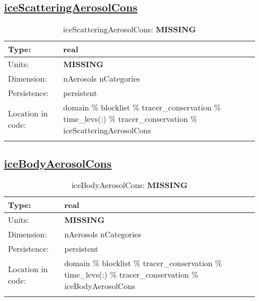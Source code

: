 \subsection[iceScatteringAerosolCons]{\hyperref[sec:var_tab_tracer_conservation]{iceScatteringAerosolCons}}
\label{subsec:var_sec_tracer_conservation_iceScatteringAerosolCons}
\begin{center}
\begin{longtable}{| p{2.0in} | p{4.0in} |}
        \hline 
        Type: & real \\
        \hline 
        Units: & {\bf \color{red} MISSING} \\
        \hline 
        Dimension: & nAerosols nCategories \\
        \hline 
        Persistence: & persistent \\
        \hline 
         Location in code: & domain \% blocklist \% tracer\_conservation \% time\_levs(:) \% tracer\_conservation \% iceScatteringAerosolCons \\
         \hline 
    \caption{iceScatteringAerosolCons: {\bf \color{red} MISSING}}
\end{longtable}
\end{center}
\subsection[iceBodyAerosolCons]{\hyperref[sec:var_tab_tracer_conservation]{iceBodyAerosolCons}}
\label{subsec:var_sec_tracer_conservation_iceBodyAerosolCons}
\begin{center}
\begin{longtable}{| p{2.0in} | p{4.0in} |}
        \hline 
        Type: & real \\
        \hline 
        Units: & {\bf \color{red} MISSING} \\
        \hline 
        Dimension: & nAerosols nCategories \\
        \hline 
        Persistence: & persistent \\
        \hline 
         Location in code: & domain \% blocklist \% tracer\_conservation \% time\_levs(:) \% tracer\_conservation \% iceBodyAerosolCons \\
         \hline 
    \caption{iceBodyAerosolCons: {\bf \color{red} MISSING}}
\end{longtable}
\end{center}
